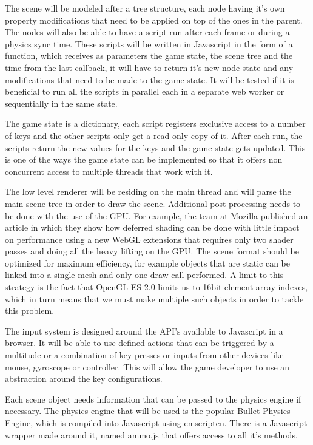 The scene will be modeled after a tree structure, each node having it’s own property
modifications that need to be applied on top of the ones in the parent. The nodes will also be able to have a script run after each frame or during a physics sync time. These scripts will be written in Javascript in the form of a function, which receives as parameters the game state, the scene tree and the time from the last callback, it will have to return it’s new node state and any modifications that need to be made to the game state.
It will be tested if it is beneficial to run all the scripts in parallel each in a separate web worker or sequentially in the same state.

The game state is a dictionary, each script registers exclusive access to a number of keys and the other scripts only get a read-only copy of it. After each run, the scripts return the new values for the keys and the game state gets updated. This is one of the ways the game state can be implemented so that it offers non concurrent access to multiple threads that work with it.

The low level renderer will be residing on the main thread and will parse the main scene tree in order to draw the scene. Additional post processing needs to be done with the use of the GPU. For example, the team at Mozilla published an article in which they show how deferred shading can be done with little impact on performance using a new WebGL extensions that requires only two shader passes and doing all the heavy lifting on the GPU. The scene format should be optimized for maximum efficiency, for example objects that are static can be linked into a single mesh and only one draw call performed.
A limit to this strategy is the fact that OpenGL ES 2.0 limits us to 16bit element array indexes, which in turn means that we must make multiple such objects in order to tackle this problem.

The input system is designed around the API’s available to Javascript in a browser. It will be able to use defined actions that can be triggered by a multitude or a combination of key presses or inputs from other devices like mouse, gyroscope or controller. This will allow the game developer to use an abstraction around the key configurations.

Each scene object needs information that can be passed to the physics engine if
necessary. The physics engine that will be used is the popular Bullet Physics Engine,
which is compiled into Javascript using emscripten. There is a Javascript wrapper made
around it, named ammo.js that offers access to all it’s methods. 

